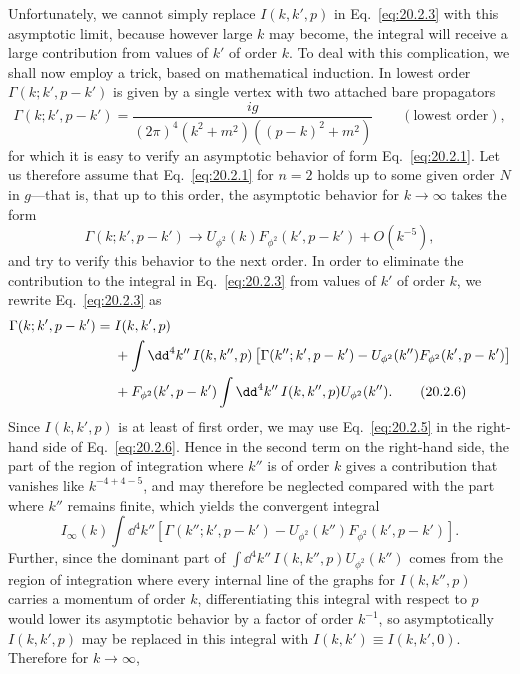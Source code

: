 Unfortunately, we cannot simply replace $I(k,k',p)$ in
Eq.~\eqref{eq:20.2.3} with this asymptotic limit, because however large $k$
may become, the integral will receive a large contribution from values of
$k'$ of order $k$. To deal with this complication, we shall now employ a
trick, based on mathematical induction. In lowest order
$\Gamma(k;k',p-k')$ is given by a single vertex with two attached bare
propagators
\[
 \Gamma(k;k',p-k')
 =\frac{ig}{(2\pi)^4(k^2+m^2)((p-k)^2+m^2)}
 \qquad(\text{lowest order}),
\]
for which it is easy to verify an asymptotic behavior of form
Eq.~\eqref{eq:20.2.1}. Let us therefore assume that
Eq.~\eqref{eq:20.2.1} for $n=2$ holds up to some given order $N$ in $g$---that
is, that up to this order, the asymptotic behavior for $k\to\infty$ takes the
form
\begin{equation}
 \Gamma(k;k',p-k')\longrightarrow
 U_{\phi^2}(k)F_{\phi^2}(k',p-k')+O(k^{-5}),
 \tag{20.2.5}\label{eq:20.2.5}
\end{equation}
and try to verify this behavior to the next order. In order to eliminate the
contribution to the integral in Eq.~\eqref{eq:20.2.3} from values of $k'$ of
order $k$, we rewrite Eq.~\eqref{eq:20.2.3} as
\begin{align}
 \Gamma(k;k',p-k')={}&I(k,k',p)
 \notag\\
 &+\int \dd^4k''\,I(k,k'',p)
 \left[\Gamma(k'';k',p-k')
 -U_{\phi^2}(k'')F_{\phi^2}(k',p-k')\right]
 \notag\\
 &+F_{\phi^2}(k',p-k')
 \int \dd^4k''\,I(k,k'',p)U_{\phi^2}(k'').
 \tag{20.2.6}\label{eq:20.2.6}
\end{align}
Since $I(k,k',p)$ is at least of first order, we may use
Eq.~\eqref{eq:20.2.5} in the right-hand side of Eq.~\eqref{eq:20.2.6}.
Hence in the second term on the right-hand side, the part of the region of
integration where $k''$ is of order $k$ gives a contribution that vanishes
like $k^{-4+4-5}$, and may therefore be neglected compared with the part
where $k''$ remains finite, which yields the convergent integral
\[
 I_\infty(k)\int \dd^4k''
 \left[\Gamma(k'';k',p-k')
 -U_{\phi^2}(k'')F_{\phi^2}(k',p-k')\right].
\]
Further, since the dominant part of
$\int \dd^4k''\,I(k,k'',p)U_{\phi^2}(k'')$ comes from the region of
integration where every internal line of the graphs for $I(k,k'',p)$ carries
a momentum of order $k$, differentiating this integral with respect to $p$
would lower its asymptotic behavior by a factor of order $k^{-1}$, so
asymptotically $I(k,k',p)$ may be replaced in this integral with
$I(k,k')\equiv I(k,k',0)$. Therefore for $k\to\infty$,
